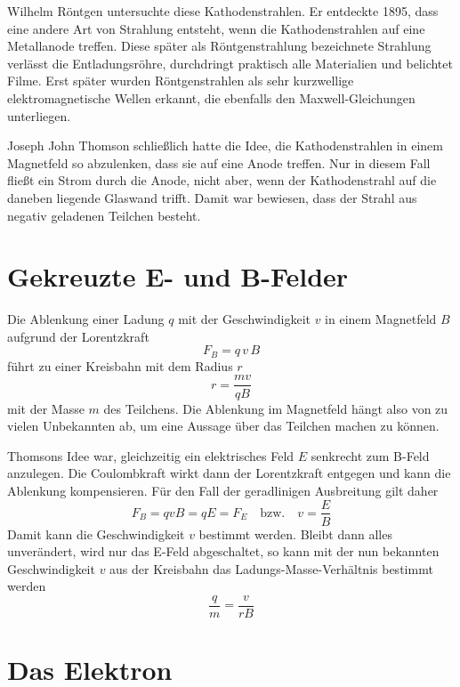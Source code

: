 Wilhelm Röntgen untersuchte diese Kathodenstrahlen. Er entdeckte 1895, dass eine andere Art von Strahlung entsteht, wenn die Kathodenstrahlen auf eine Metallanode treffen. Diese später als Röntgenstrahlung bezeichnete Strahlung verlässt die Entladungsröhre, durchdringt praktisch alle Materialien und belichtet Filme. Erst später wurden Röntgenstrahlen als sehr kurzwellige elektromagnetische Wellen erkannt, die ebenfalls den Maxwell-Gleichungen unterliegen.

Joseph John Thomson schließlich hatte die Idee, die Kathodenstrahlen in einem Magnetfeld so abzulenken, dass sie auf eine Anode treffen. Nur in diesem Fall fließt ein Strom durch die Anode, nicht aber, wenn der Kathodenstrahl auf die daneben liegende Glaswand trifft. Damit war bewiesen, dass der Strahl aus negativ geladenen Teilchen besteht.

\section{Gekreuzte E- und B-Felder}

Die Ablenkung einer Ladung $q$ mit der Geschwindigkeit $v$ in einem Magnetfeld $B$ aufgrund der Lorentzkraft
\begin{equation}
    F_B = q \, v \, B
\end{equation}
führt zu einer Kreisbahn mit dem Radius $r$
\begin{equation}
    r = \frac{m v}{q B}
\end{equation}
mit der Masse $m$ des Teilchens. Die Ablenkung im Magnetfeld hängt also von zu vielen Unbekannten ab, um eine Aussage über das Teilchen machen zu können.

Thomsons Idee war, gleichzeitig ein elektrisches Feld $E$ senkrecht zum B-Feld anzulegen. Die Coulombkraft wirkt dann der Lorentzkraft entgegen und kann die Ablenkung kompensieren. Für den Fall der geradlinigen Ausbreitung gilt daher
\begin{equation}
    F_B = q v B = q E = F_E  \quad \text{bzw.} \quad v = \frac{E}{B} 
\end{equation}
Damit kann die Geschwindigkeit $v$ bestimmt werden. Bleibt dann alles unverändert, wird nur das E-Feld abgeschaltet, so kann mit der nun bekannten Geschwindigkeit $v$ aus der Kreisbahn das Ladungs-Masse-Verhältnis bestimmt werden
\begin{equation}
    \frac{q}{m} = \frac{v}{r B}
\end{equation}

\section{Das Elektron}

